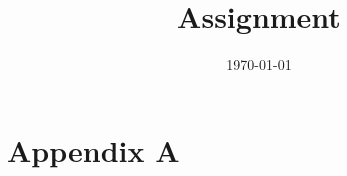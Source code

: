\documentclass{SelimArticle} %
\title{Assignment}   %
\date{\today}
\begin{document}
\appendix
\section{Appendix A}

\end{document}
